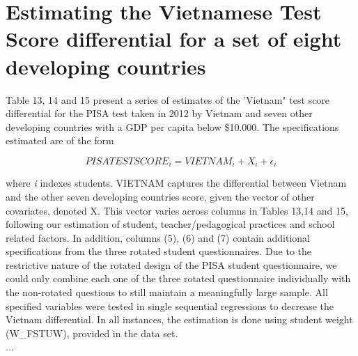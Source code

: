 \documentclass[12pt]{article}%
\begin{document}
\section{Estimating the Vietnamese Test Score differential for a set of eight developing countries}

Table 13, 14 and 15 present a series of estimates of the 'Vietnam" test score differential for the PISA test taken in 2012 by Vietnam and seven other developing countries with a GDP per capita below \$10.000. The specifications estimated are of the form

\[PISATESTSCORE_{i} = VIETNAM_{i} + X_{i} + \epsilon_{i}\]

where \textit{i} indexes students. VIETNAM captures the differential between Vietnam and the other seven developing countries score, given the vector of other covariates, denoted X. This vector varies across columns in Tables 13,14 and 15, following our estimation of student, teacher/pedagogical practices and school related factors. In addition, columns (5), (6) and (7) contain additional specifications from the three rotated student questionnaires. Due to the restrictive nature of the rotated design of the PISA student questionnaire, we could only combine each one of the three rotated questionnaire individually with the non-rotated questions to still maintain a meaningfully large sample. All specified variables were tested in single sequential regressions to decrease the Vietnam differential. In all instances, the estimation is done using student weight (W\_FSTUW), provided in the data set.\\
...
 
\end{document}
